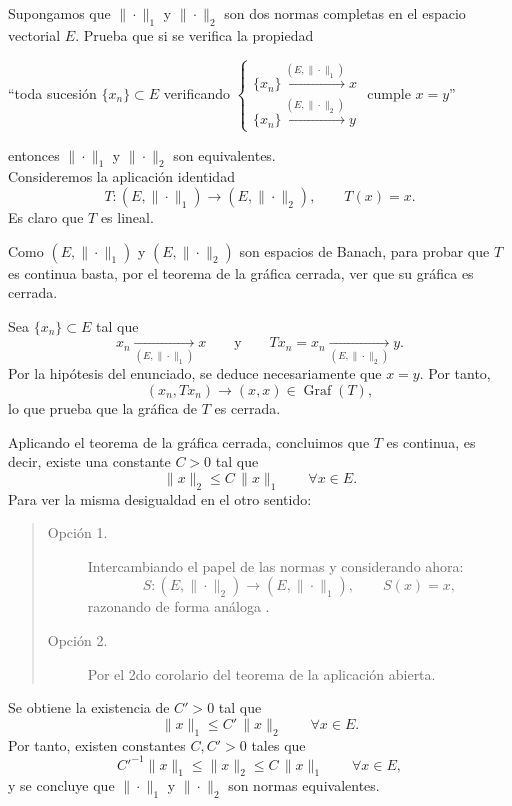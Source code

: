 \documentclass[12pt]{article}
\begin{document}
    \begin{ejercicio}[3 puntos]
        Supongamos que $\|\cdot \|_1$ y $\|\cdot \|_2$ son dos normas completas en el espacio vectorial $E$. Prueba que si se verifica la propiedad
        \begin{center}
            ``toda sucesión $\{x_n\}\subset E$ verificando $
                \left\{\begin{array}{l}
                    \{x_n\} \stackrel{(E,\|\cdot \|_1)}{\longrightarrow} x \\
                    \{x_n\} \stackrel{(E,\|\cdot \|_2)}{\longrightarrow} y
                \end{array}\right.$ cumple $x=y$''
        \end{center}
        entonces $\|\cdot \|_1$ y $\|\cdot \|_2$ son equivalentes.\\


        Consideremos la aplicación identidad
        \[
        T:(E,\|\cdot\|_1)\longrightarrow (E,\|\cdot\|_2),
        \qquad T(x)=x.
        \]
        Es claro que $T$ es lineal.
        
        Como $(E,\|\cdot\|_1)$ y $(E,\|\cdot\|_2)$ son espacios de Banach, para probar que $T$ es continua basta, por el teorema de la gráfica cerrada, ver que su gráfica es cerrada.
        
        Sea $\{x_n\}\subset E$ tal que
        \[
        x_n \xrightarrow[(E,\|\cdot\|_1)]{} x
        \qquad\text{y}\qquad
        Tx_n = x_n \xrightarrow[(E,\|\cdot\|_2)]{} y.
        \]
        Por la hipótesis del enunciado, se deduce necesariamente que $x=y$.
        Por tanto,
        \[
        (x_n,Tx_n)\longrightarrow (x,x)\in \operatorname{Graf}(T),
        \]
        lo que prueba que la gráfica de $T$ es cerrada.
        
        Aplicando el teorema de la gráfica cerrada, concluimos que $T$ es continua, es decir, existe una constante $C>0$ tal que
        \[
        \|x\|_2 \le C\,\|x\|_1
        \qquad \forall x\in E.
        \]
        Para ver la misma desigualdad en el otro sentido:
        \begin{quote}
        \begin{description}
        \item[Opción 1.] 
        Intercambiando el papel de las normas y considerando ahora:
        \[
        S:(E,\|\cdot\|_2)\longrightarrow (E,\|\cdot\|_1),
        \qquad S(x)=x,
        \]
        razonando de forma análoga .
        \item[Opción 2.]Por el 2do corolario del teorema de la aplicación abierta.
        \end{description}
        \end{quote}
        
        \noindent Se obtiene la existencia de $C'>0$ tal que
        \[
        \|x\|_1 \le C'\,\|x\|_2
        \qquad \forall x\in E.
        \]
        Por tanto, existen constantes $C,C'>0$ tales que
        \[
        C'^{-1}\|x\|_1 \le \|x\|_2 \le C\,\|x\|_1
        \qquad \forall x\in E,
        \]
        y se concluye que $\|\cdot\|_1$ y $\|\cdot\|_2$ son normas equivalentes.
    \end{ejercicio}
    \newpage
\end{document}
